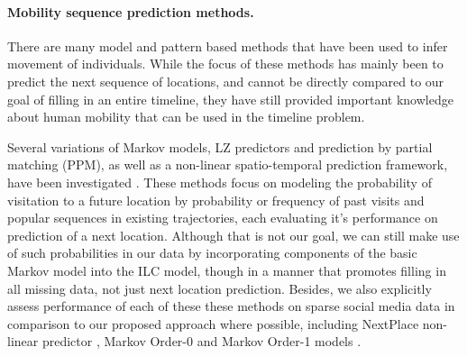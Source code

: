 \paragraph{Mobility sequence prediction methods.}
There are many model and pattern based methods that have been used to infer movement of individuals. While the focus of these methods has mainly been to predict the next sequence of locations, and cannot be directly compared to our goal of filling in an entire timeline, they have still provided important knowledge about human mobility that can be used in the timeline problem.

Several variations of Markov models, LZ predictors and prediction by partial matching (PPM), as well as a non-linear spatio-temporal prediction framework, have been investigated \cite{118,74,134,asahara2012mixed,136}. These methods focus on modeling the probability of visitation to a future location by probability or frequency of past visits and popular sequences in existing trajectories, each evaluating it's performance on prediction of a next location. Although that is not our goal, we can still make use of such probabilities in our data by incorporating components of the basic Markov model into the ILC model, though in a manner that promotes filling in all missing data, not just next location prediction. Besides, we also explicitly assess performance of each of these these methods on sparse social media data in comparison to our proposed approach where possible, including NextPlace non-linear predictor \cite{136}, Markov Order-0 and Markov Order-1 models \cite{134}. 

